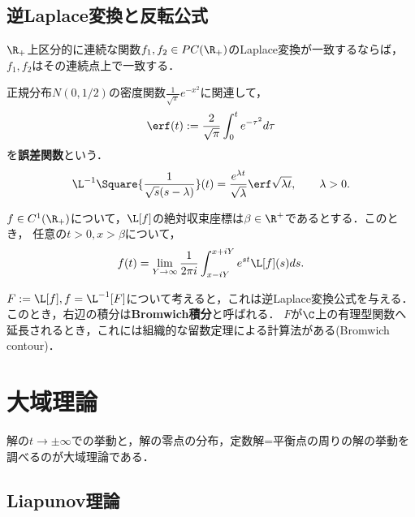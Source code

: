 \documentclass[uplatex,dvipdfmx]{jsreport}
\begin{document}
\subsection{逆Laplace変換と反転公式}

\begin{theorem}
    $\R_+$上区分的に連続な関数$f_1,f_2\in PC(\R_+)$のLaplace変換が一致するならば，$f_1,f_2$はその連続点上で一致する．
\end{theorem}

\begin{example}
    正規分布$N(0,1/2)$の密度関数$\frac{1}{\sqrt{\pi}}e^{-x^2}$に関連して，
    \[\erf(t):=\frac{2}{\sqrt{\pi}}\int^t_0e^{-\tau^2}d\tau\]
    を\textbf{誤差関数}という．
    \[\L^{-1}\Square{\frac{1}{\sqrt{s}(s-\lambda)}}(t)=\frac{e^{\lambda t}}{\sqrt{\lambda}}\erf\sqrt{\lambda t},\qquad\lambda>0.\]
\end{example}

\begin{corollary}
    $f\in C^1(\R_+)$について，$\L[f]$の絶対収束座標は$\beta\in\R^+$であるとする．このとき，
    任意の$t>0,x>\beta$について，
    \[f(t)=\lim_{Y\to\infty}\frac{1}{2\pi i}\int^{x+iY}_{x-iY}e^{st}\L[f](s)ds.\]
\end{corollary}
\begin{remarks}
    $F:=\L[f],f=\L^{-1}[F]$について考えると，これは逆Laplace変換公式を与える．
    このとき，右辺の積分は\textbf{Bromwich積分}と呼ばれる．
    $F$が$\C$上の有理型関数へ延長されるとき，これには組織的な留数定理による計算法がある(Bromwich contour)．
\end{remarks}

\section{大域理論}

\begin{tcolorbox}[colframe=ForestGreen, colback=ForestGreen!10!white,breakable,colbacktitle=ForestGreen!40!white,coltitle=black,fonttitle=\bfseries\sffamily,
title=]
    解の$t\to\pm\infty$での挙動と，解の零点の分布，定数解=平衡点の周りの解の挙動を調べるのが大域理論である．
\end{tcolorbox}

\subsection{Liapunov理論}
\end{document}
